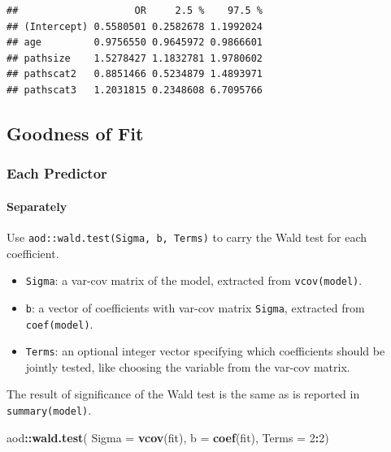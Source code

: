 \documentclass[
]{ctexart}
\newenvironment{Shaded}{\begin{snugshade}}{\end{snugshade}}
\newcommand{\AttributeTok}[1]{\textcolor[rgb]{0.13,0.29,0.53}{#1}}
\newcommand{\DecValTok}[1]{\textcolor[rgb]{0.00,0.00,0.81}{#1}}
\newcommand{\FunctionTok}[1]{\textcolor[rgb]{0.13,0.29,0.53}{\textbf{#1}}}
\newcommand{\NormalTok}[1]{#1}
\newcommand{\SpecialCharTok}[1]{\textcolor[rgb]{0.81,0.36,0.00}{\textbf{#1}}}
\begin{document}
\begin{verbatim}
##                    OR     2.5 %    97.5 %
## (Intercept) 0.5580501 0.2582678 1.1992024
## age         0.9756550 0.9645972 0.9866601
## pathsize    1.5278427 1.1832781 1.9780602
## pathscat2   0.8851466 0.5234879 1.4893971
## pathscat3   1.2031815 0.2348608 6.7095766
\end{verbatim}

\hypertarget{goodness-of-fit-1}{%
\subsection{Goodness of Fit}\label{goodness-of-fit-1}}

\hypertarget{each-predictor}{%
\subsubsection{Each Predictor}\label{each-predictor}}

\hypertarget{separately}{%
\paragraph{Separately}\label{separately}}

Use \texttt{aod::wald.test(Sigma,\ b,\ Terms)} to carry the Wald test
for each coefficient.

\begin{itemize}
\item
  \texttt{Sigma}: a var-cov matrix of the model, extracted from
  \texttt{vcov(model)}.
\item
  \texttt{b}: a vector of coefficients with var-cov matrix
  \texttt{Sigma}, extracted from \texttt{coef(model)}.
\item
  \texttt{Terms}: an optional integer vector specifying which
  coefficients should be jointly tested, like choosing the variable from
  the var-cov matrix.
\end{itemize}

The result of significance of the Wald test is the same as is reported
in \texttt{summary(model)}.

\begin{Shaded}
\begin{Highlighting}[]
\NormalTok{aod}\SpecialCharTok{::}\FunctionTok{wald.test}\NormalTok{(}
  \AttributeTok{Sigma =} \FunctionTok{vcov}\NormalTok{(fit),}
  \AttributeTok{b =} \FunctionTok{coef}\NormalTok{(fit), }
  \AttributeTok{Terms =} \DecValTok{2}\SpecialCharTok{:}\DecValTok{2}\NormalTok{)}
\end{Highlighting}
\end{Shaded}
\end{document}
